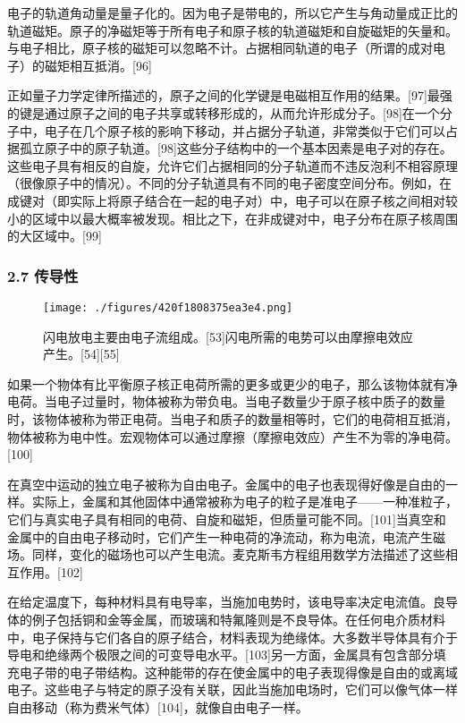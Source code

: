电子的轨道角动量是量子化的。因为电子是带电的，所以它产生与角动量成正比的轨道磁矩。原子的净磁矩等于所有电子和原子核的轨道磁矩和自旋磁矩的矢量和。与电子相比，原子核的磁矩可以忽略不计。占据相同轨道的电子（所谓的成对电子）的磁矩相互抵消。[96]

正如量子力学定律所描述的，原子之间的化学键是电磁相互作用的结果。[97]最强的键是通过原子之间的电子共享或转移形成的，从而允许形成分子。[98]在一个分子中，电子在几个原子核的影响下移动，并占据分子轨道，非常类似于它们可以占据孤立原子中的原子轨道。[98]这些分子结构中的一个基本因素是电子对的存在。这些电子具有相反的自旋，允许它们占据相同的分子轨道而不违反泡利不相容原理（很像原子中的情况）。不同的分子轨道具有不同的电子密度空间分布。例如，在成键对（即实际上将原子结合在一起的电子对）中，电子可以在原子核之间相对较小的区域中以最大概率被发现。相比之下，在非成键对中，电子分布在原子核周围的大区域中。[99]
\subsubsection{2.7 传导性}
\begin{figure}[ht]
\centering
\texttt{[image: ./figures/420f1808375ea3e4.png]}
\caption{闪电放电主要由电子流组成。[53]闪电所需的电势可以由摩擦电效应产生。[54][55]} \label{fig_DZ_11}
\end{figure}
如果一个物体有比平衡原子核正电荷所需的更多或更少的电子，那么该物体就有净电荷。当电子过量时，物体被称为带负电。当电子数量少于原子核中质子的数量时，该物体被称为带正电荷。当电子和质子的数量相等时，它们的电荷相互抵消，物体被称为电中性。宏观物体可以通过摩擦（摩擦电效应）产生不为零的净电荷。[100]

在真空中运动的独立电子被称为自由电子。金属中的电子也表现得好像是自由的一样。实际上，金属和其他固体中通常被称为电子的粒子是准电子——一种准粒子，它们与真实电子具有相同的电荷、自旋和磁矩，但质量可能不同。[101]当真空和金属中的自由电子移动时，它们产生一种电荷的净流动，称为电流，电流产生磁场。同样，变化的磁场也可以产生电流。麦克斯韦方程组用数学方法描述了这些相互作用。[102]

在给定温度下，每种材料具有电导率，当施加电势时，该电导率决定电流值。良导体的例子包括铜和金等金属，而玻璃和特氟隆则是不良导体。在任何电介质材料中，电子保持与它们各自的原子结合，材料表现为绝缘体。大多数半导体具有介于导电和绝缘两个极限之间的可变导电水平。[103]另一方面，金属具有包含部分填充电子带的电子带结构。这种能带的存在使金属中的电子表现得像是自由的或离域电子。这些电子与特定的原子没有关联，因此当施加电场时，它们可以像气体一样自由移动（称为费米气体）[104]，就像自由电子一样。

